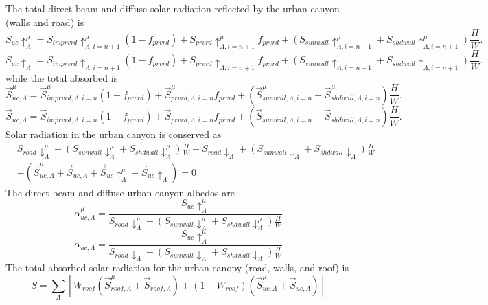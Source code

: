 \documentclass[12pt,authoryear]{elsarticle}
\numberwithin{equation}{section} %
\begin{document}
The total direct beam and diffuse solar radiation reflected by the urban canyon (walls and road) is
\begin{equation}
S_{uc}\uparrow_{\Lambda}^{\mu}=S_{imprvrd}\uparrow_{\Lambda,i=n+1}^{\mu}(1-f_{prvrd})+S_{prvrd}\uparrow_{\Lambda,i=n+1}^{\mu}f_{prvrd}+(S_{sunwall}\uparrow_{\Lambda,i=n+1}^{\mu}+S_{shdwall}\uparrow_{\Lambda,i=n+1}^{\mu})\frac{H}{W}.
\end{equation}
\begin{equation}
S_{uc}\uparrow_{\Lambda}=S_{imprvrd}\uparrow_{\Lambda,i=n+1}(1-f_{prvrd})+S_{prvrd}\uparrow_{\Lambda,i=n+1}f_{prvrd}+(S_{sunwall}\uparrow_{\Lambda,i=n+1}+S_{shdwall}\uparrow_{\Lambda,i=n+1})\frac{H}{W}.
\end{equation}
while the total absorbed is
\begin{equation}
\overrightarrow{S}_{uc,\Lambda}^{\mu}=\overrightarrow{S}_{imprvrd,\Lambda,i=n}^{\mu}(1-f_{prvrd})+\overrightarrow{S}_{prvrd,\Lambda,i=n}^{\mu}f_{prvrd}+(\overrightarrow{S}_{sunwall,\Lambda,i=n}^{\mu}+\overrightarrow{S}_{shdwall,\Lambda,i=n}^{\mu})\frac{H}{W}.
\end{equation}
\begin{equation}
\overrightarrow{S}_{uc,\Lambda}=\overrightarrow{S}_{imprvrd,\Lambda,i=n}(1-f_{prvrd})+\overrightarrow{S}_{prvrd,\Lambda,i=n}f_{prvrd}+(\overrightarrow{S}_{sunwall,\Lambda,i=n}+\overrightarrow{S}_{shdwall,\Lambda,i=n})\frac{H}{W}.
\end{equation}
Solar radiation in the urban canyon is conserved as
\begin{equation}
\begin{aligned}
&S_{road}\downarrow_{\Lambda}^{\mu}+(S_{sunwall}\downarrow_{\Lambda}^{\mu}+S_{shdwall}\downarrow_{\Lambda}^{\mu})\frac{H}{W} + S_{road}\downarrow_{\Lambda}+(S_{sunwall}\downarrow_{\Lambda}+S_{shdwall}\downarrow_{\Lambda})\frac{H}{W} \\
&-(\overrightarrow{S}_{uc,\Lambda}^{\mu}+\overrightarrow{S}_{uc,\Lambda}+\overrightarrow{S}_{uc}\uparrow_{\Lambda}^{\mu}+\overrightarrow{S}_{uc}\uparrow_{\Lambda}) = 0
\end{aligned}
\end{equation}
The direct beam and diffuse urban canyon albedos are
\begin{equation}
\alpha_{uc,\Lambda}^{\mu} = \frac{S_{uc}\uparrow_{\Lambda}^{\mu}}{S_{road}\downarrow_{\Lambda}^{\mu}+(S_{sunwall}\downarrow_{\Lambda}^{\mu}+S_{shdwall}\downarrow_{\Lambda}^{\mu})\frac{H}{W}}
\end{equation}
\begin{equation}
\alpha_{uc,\Lambda} = \frac{S_{uc}\uparrow_{\Lambda}^{\mu}}{S_{road}\downarrow_{\Lambda}+(S_{sunwall}\downarrow_{\Lambda}+S_{shdwall}\downarrow_{\Lambda})\frac{H}{W}}
\end{equation}
The total absorbed solar radiation for the urban canopy (road, walls, and roof) is
\begin{equation}
S=\sum_{\Lambda}[W_{roof}(\overrightarrow{S}_{roof,\Lambda}^{\mu}+\overrightarrow{S}_{roof,\Lambda})+(1-W_{roof})(\overrightarrow{S}_{uc,\Lambda}^{\mu}+\overrightarrow{S}_{uc,\Lambda})]
\end{equation}
\end{document}
